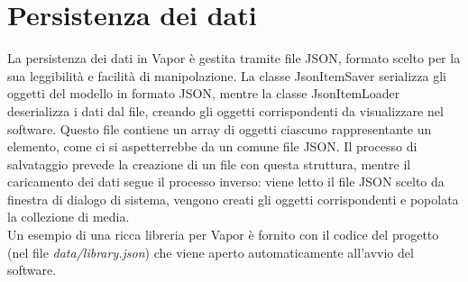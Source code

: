 \documentclass[10pt]{article}
\begin{document}
\section{Persistenza dei dati} \label{persistenza}
La persistenza dei dati in Vapor è gestita tramite file JSON, formato scelto per la sua leggibilità e facilità di manipolazione. La classe JsonItemSaver serializza gli oggetti del modello in formato JSON, mentre la classe JsonItemLoader deserializza i dati dal file, creando gli oggetti corrispondenti da visualizzare nel software. Questo file contiene un array di oggetti ciascuno rappresentante un elemento, come ci si aspetterrebbe da un comune file JSON. Il processo di salvataggio prevede la creazione di un file con questa struttura, mentre il caricamento dei dati segue il processo inverso: viene letto il file JSON scelto da finestra di dialogo di sistema, vengono creati gli oggetti corrispondenti e popolata la collezione di media.
\\Un esempio di una ricca libreria per Vapor è fornito con il codice del progetto (nel file \textit{data/library.json}) che viene aperto automaticamente all'avvio del software.
\end{document}

